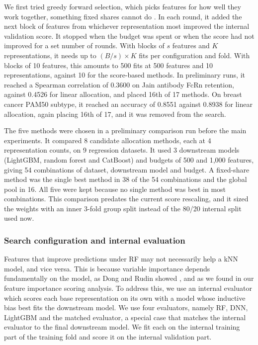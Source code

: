 We first tried greedy forward selection, which picks features for how well they work together, something fixed shares cannot do \citep{Kohavi1997, Guyon2003}. In each round, it added the next block of features from whichever representation most improved the internal validation score. It stopped when the budget was spent or when the score had not improved for a set number of rounds. With blocks of $s$ features and $K$ representations, it needs up to $(B/s) \times K$ fits per configuration and fold. With blocks of 10 features, this amounts to 500 fits at 500 features and 10 representations, against 10 for the score-based methods. In preliminary runs, it reached a Spearman correlation of 0.3600 on Jain antibody FcRn retention, against 0.4526 for linear allocation, and placed 16th of 17 methods. On breast cancer PAM50 subtype, it reached an accuracy of 0.8551 against 0.8938 for linear allocation, again placing 16th of 17, and it was removed from the search.

The five methods were chosen in a preliminary comparison run before the main experiments. It compared 8 candidate allocation methods, each at 4 representation counts, on 9 regression datasets. It used 3 downstream models (LightGBM, random forest and CatBoost) and budgets of 500 and 1,000 features, giving 54 combinations of dataset, downstream model and budget. A fixed-share method was the single best method in 38 of the 54 combinations and the global pool in 16. All five were kept because no single method was best in most combinations. This comparison predates the current score rescaling, and it sized the weights with an inner 3-fold group split instead of the 80/20 internal split used now.

\subsubsection{Search configuration and internal evaluation}

Features that improve predictions under RF may not necessarily help a kNN model, and vice versa. This is because variable importance depends fundamentally on the model, as Dong and Rudin showed \citep{Dong2020}, and as we found in our feature importance scoring analysis. To address this, we use an internal evaluator which scores each base representation on its own with a model whose inductive bias best fits the downstream model. We use four evaluators, namely RF, DNN, LightGBM and the matched evaluator, a special case that matches the internal evaluator to the final downstream model. We fit each on the internal training part of the training fold and score it on the internal validation part.

